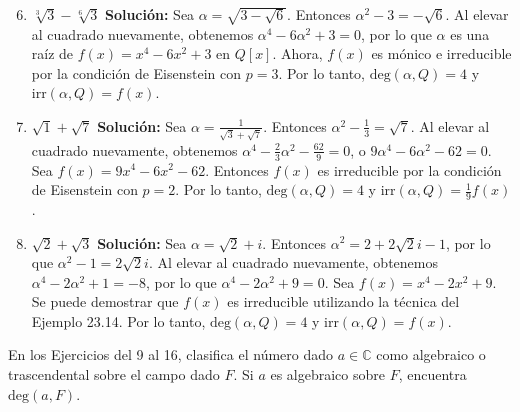 \begin{enumerate}
    \setcounter{enumi}{5}
    \item $\sqrt[3]{3} - \sqrt[6]{3}$
    \textbf{Solución:}
    Sea $\alpha = \sqrt{3 - \sqrt{6}}$. Entonces $\alpha^2 - 3 = -\sqrt{6}$. Al elevar al cuadrado nuevamente, obtenemos $\alpha^4 - 6\alpha^2 + 3 = 0$, por lo que $\alpha$ es una raíz de $f(x) = x^4 - 6x^2 + 3$ en $Q[x]$. Ahora, $f(x)$ es mónico e irreducible por la condición de Eisenstein con $p = 3$. Por lo tanto, $\text{deg}(\alpha, Q) = 4$ y $\text{irr}(\alpha, Q) = f(x)$.
    \item $\sqrt{1} + \sqrt{7}$
    \textbf{Solución:}
    Sea $\alpha = \frac{1}{\sqrt{3} + \sqrt{7}}$. Entonces $\alpha^2 - \frac{1}{3} = \sqrt{7}$. Al elevar al cuadrado nuevamente, obtenemos $\alpha^4 - \frac{2}{3}\alpha^2 - \frac{62}{9} = 0$, o $9\alpha^4 - 6\alpha^2 - 62 = 0$. Sea $f(x) = 9x^4 - 6x^2 - 62$. Entonces $f(x)$ es irreducible por la condición de Eisenstein con $p = 2$. Por lo tanto, $\text{deg}(\alpha, Q) = 4$ y $\text{irr}(\alpha, Q) = \frac{1}{9}f(x)$.
    \item $\sqrt{2} + \sqrt{3}$
    \textbf{Solución:}
     Sea $\alpha = \sqrt{2} + i$. Entonces $\alpha^2 = 2 + 2\sqrt{2}i - 1$, por lo que $\alpha^2 - 1 = 2\sqrt{2}i$. Al elevar al cuadrado nuevamente, obtenemos $\alpha^4 - 2\alpha^2 + 1 = -8$, por lo que $\alpha^4 - 2\alpha^2 + 9 = 0$. Sea $f(x) = x^4 - 2x^2 + 9$. Se puede demostrar que $f(x)$ es irreducible utilizando la técnica del Ejemplo 23.14. Por lo tanto, $\text{deg}(\alpha, Q) = 4$ y $\text{irr}(\alpha, Q) = f(x)$.
\end{enumerate}

En los Ejercicios del 9 al 16, clasifica el número dado $a \in \mathbb{C}$ como algebraico o trascendental sobre el campo dado $F$. Si $a$ es algebraico sobre $F$, encuentra $\text{deg}(a, F)$.

